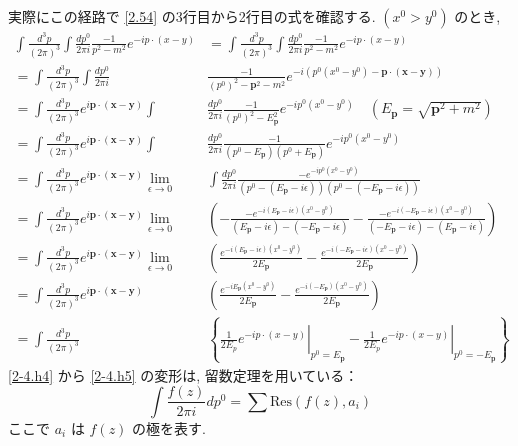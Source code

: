 \documentclass[a4paper,12pt]{article}
\begin{document}
実際にこの経路で \eqref{2.54} の3行目から2行目の式を確認する. $(x^0 > y^0)$ のとき,
\begin{align*}
  \int \frac{d^3 p}{(2\pi)^3} \int \frac{dp^0}{2\pi i}\frac{-1}{p^2 -m^2} e^{-ip \cdot (x - y)} &= \int \frac{d^3 p}{(2\pi)^3} \int \frac{dp^0}{2\pi i}\frac{-1}{p^2 -m^2} e^{-ip \cdot (x - y)} \tag{2-4.h1}\\
  = \int \frac{d^3 p}{(2\pi)^3} \int \frac{dp^0}{2\pi i}&\frac{-1}{(p^0)^2 - \mathbf{p}^2 -m^2} e^{-i(p^0(x^0 - y^0) - \mathbf{p} \cdot (\mathbf{x} - \mathbf{y}))} \tag{2-4.h2}\\
  = \int \frac{d^3 p}{(2\pi)^3} e^{i\mathbf{p}\cdot(\mathbf{x} - \mathbf{y})} \int& \frac{dp^0}{2\pi i}\frac{-1}{(p^0)^2 - E_{\mathbf{p}}^2} e^{-ip^0(x^0 - y^0)}\quad(E_{\mathbf{p}} = \sqrt{\mathbf{p}^2 + m^2}) \tag{2-4.h3}\\
  = \int \frac{d^3 p}{(2\pi)^3} e^{i\mathbf{p}\cdot(\mathbf{x} - \mathbf{y})} \int &\frac{dp^0}{2\pi i}\frac{-1}{(p^0 - E_{\mathbf{p}}) (p^0 + E_{\mathbf{p}})} e^{-ip^0(x^0 - y^0)} \label{2-4.h4}\tag{2-4.h4}\\
  = \int \frac{d^3 p}{(2\pi)^3} e^{i\mathbf{p}\cdot(\mathbf{x} - \mathbf{y})} \lim_{\epsilon \to 0}&\int \frac{dp^0}{2\pi i}\frac{-e^{-ip^0(x^0 - y^0)}}{(p^0 - (E_{\mathbf{p}} - i\epsilon)) (p^0 - (-E_{\mathbf{p}} - i\epsilon))} \label{2-4.h5}\tag{2-4.h5}\\
  = \int \frac{d^3 p}{(2\pi)^3} e^{i\mathbf{p}\cdot(\mathbf{x} - \mathbf{y})} \lim_{\epsilon \to 0}&\left( -\frac{-e^{-i(E_{\mathbf{p}} - i\epsilon)(x^0 - y^0)}}{(E_{\mathbf{p}} - i\epsilon)-(-E_{\mathbf{p}} - i\epsilon)} - \frac{-e^{-i(-E_{\mathbf{p}} - i\epsilon)(x^0 - y^0)}}{(-E_{\mathbf{p}} - i\epsilon)-(E_{\mathbf{p}} - i\epsilon)} \right) \tag{2-4.h6}\\
  = \int \frac{d^3 p}{(2\pi)^3} e^{i\mathbf{p}\cdot(\mathbf{x} - \mathbf{y})} \lim_{\epsilon \to 0}&\left( \frac{e^{-i(E_{\mathbf{p}} - i\epsilon)(x^0 - y^0)}}{2E_{\mathbf{p}}} - \frac{e^{-i(-E_{\mathbf{p}} - i\epsilon)(x^0 - y^0)}}{2E_{\mathbf{p}}} \right) \tag{2-4.h7}\\
  = \int \frac{d^3 p}{(2\pi)^3} e^{i\mathbf{p}\cdot(\mathbf{x} - \mathbf{y})} &\left( \frac{e^{-iE_{\mathbf{p}}(x^0 - y^0)}}{2E_{\mathbf{p}}} - \frac{e^{-i(-E_{\mathbf{p}})(x^0 - y^0)}}{2E_{\mathbf{p}}} \right) \tag{2-4.h8}\\
  = \int \frac{d^3 p}{(2\pi)^3} &\left\{ \left.\frac{1}{2E_p} e^{-ip \cdot (x - y)}\right|_{p^0 = E_{\mathbf{p}}} - \left.\frac{1}{2E_p} e^{-ip \cdot (x - y)}\right|_{p^0 = -E_{\mathbf{p}}} \right\} \tag{2-4.h9}
\end{align*}
\eqref{2-4.h4} から \eqref{2-4.h5} の変形は, 留数定理を用いている：
\begin{equation*}
  \int \frac{f(z)}{2\pi i} dp^0 = \sum \text{Res}(f(z), a_i)
\end{equation*}
ここで $a_i$ は $f(z)$ の極を表す. 
\end{document}
